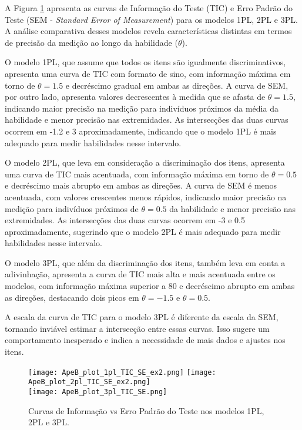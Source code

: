 A Figura \ref{fig:ApeB_plot_TIC_SE} apresenta as curvas de Informação do Teste (TIC) e Erro Padrão do Teste (SEM - \textit{Standard Error of Measurement}) para os modelos 1PL, 2PL e 3PL. A análise comparativa desses modelos revela características distintas em termos de precisão da medição ao longo da habilidade ($\theta$).

O modelo 1PL, que assume que todos os itens são igualmente discriminativos, apresenta uma curva de TIC com formato de sino, com informação máxima em torno de $\theta = 1.5$ e decréscimo gradual em ambas as direções. A curva de SEM, por outro lado, apresenta valores decrescentes à medida que se afasta de $\theta = 1.5$, indicando maior precisão na medição para indivíduos próximos da média da habilidade e menor precisão nas extremidades. As intersecções das duas curvas ocorrem em -1.2 e 3 aproximadamente, indicando que o modelo 1PL é mais adequado para medir habilidades nesse intervalo.

O modelo 2PL, que leva em consideração a discriminação dos itens, apresenta uma curva de TIC mais acentuada, com informação máxima em torno de $\theta = 0.5$ e decréscimo mais abrupto em ambas as direções. A curva de SEM é menos acentuada, com valores crescentes menos rápidos, indicando maior precisão na medição para indivíduos próximos de $\theta = 0.5$ da habilidade e menor precisão nas extremidades. As intersecções das duas curvas ocorrem em -3 e 0.5 aproximadamente, sugerindo que o modelo 2PL é mais adequado para medir habilidades nesse intervalo.

O modelo 3PL, que além da discriminação dos itens, também leva em conta a adivinhação, apresenta a curva de TIC mais alta e mais acentuada entre os modelos, com informação máxima superior a 80 e decréscimo abrupto em ambas as direções, destacando dois picos em $\theta = -1.5$ e $\theta = 0.5$.

A escala da curva de TIC para o modelo 3PL é diferente da escala da SEM, tornando inviável estimar a intersecção entre essas curvas. Isso sugere um comportamento inesperado e indica a necessidade de mais dados e ajustes nos itens.

\begin{figure}[!ht]
    \centering
    \texttt{[image: ApeB\_plot\_1pl\_TIC\_SE\_ex2.png]}
    \texttt{[image: ApeB\_plot\_2pl\_TIC\_SE\_ex2.png]} \\ 
    \texttt{[image: ApeB\_plot\_3pl\_TIC\_SE.png]} 
    \caption{Curvas de Informação vs Erro Padrão do Teste nos modelos 1PL, 2PL e 3PL.}
    \label{fig:ApeB_plot_TIC_SE}
    \end{figure}
  
